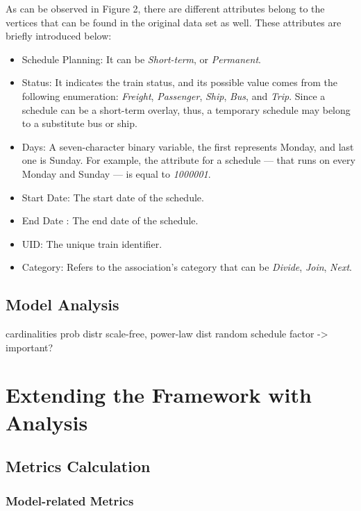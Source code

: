 As can be observed in Figure 2, %
there are different attributes belong to the vertices that can be found in the original data set as well. These attributes are briefly introduced below:
\begin{itemize}
	\item{\textsf{Schedule Planning}}: It can be \textit{Short-term}, or \textit{Permanent}.
	\item{\textsf{Status}}: It indicates the train status, and its possible value comes from the following enumeration: \textit{Freight}, \textit{Passenger}, \textit{Ship}, \textit{Bus}, and \textit{Trip}. Since a schedule can be a short-term overlay, thus, a temporary schedule may belong to a substitute bus or ship.
	\item{\textsf{Days}}: A seven-character binary variable, the first represents Monday, and last one is Sunday. For example, the attribute for a schedule --- that runs on every Monday and Sunday --- is equal to \textit{1000001}.
	\item{\textsf{Start Date}}: The start date of the schedule.
	\item{\textsf{End Date}} : The end date of the schedule.
	\item{\textsf{UID}}: The unique train identifier.
	\item{\textsf{Category}}: Refers to the association's category that can be \textit{Divide}, \textit{Join}, \textit{Next}.
\end{itemize}


\subsection{Model Analysis}\label{sec:model_analysis}
cardinalities
	prob distr
	scale-free, power-law dist
	random schedule factor -> important?


\section{Extending the Framework with Analysis}
\subsection{Metrics Calculation}
\subsubsection{Model-related Metrics}

